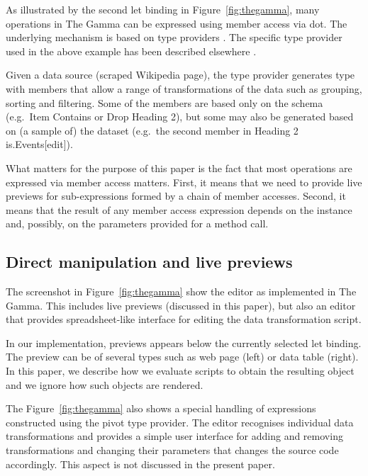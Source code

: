 \documentclass[sigplan,10pt]{acmart}\settopmatter{printfolios=true,printccs=false,printacmref=false}
\theoremstyle{plain}
\theoremstyle{definition}
\newcommand{\ident}[1]{\textnormal{\sffamily #1}}
\begin{document}
As illustrated by the second let binding in Figure~\ref{fig:thegamma}, many operations
in The Gamma can be expressed using member access via dot. The underlying mechanism is based
on type providers \cite{providers-fsharp,providers-idris}. The specific type provider used in 
the above example has been described elsewhere \cite{gamma}.

Given a data source (scraped Wikipedia page), the type provider generates type with members that allow
a range of transformations of the data such as grouping, sorting and filtering. Some of the members
are based only on the schema (e.g.~\ident{\textquotesingle Item Contains\textquotesingle} or 
\ident{\textquotesingle Drop Heading 2\textquotesingle}), but some may also be generated based
on (a sample of) the dataset (e.g.~the second member in \ident{\textquotesingle Heading 2 
is\textquotesingle.\textquotesingle Events[edit]\textquotesingle}). 

What matters for the purpose of this paper is 
the fact that most operations are expressed via member access matters. First, it means 
that we need to provide live previews for sub-expressions formed by a chain of member accesses.
Second, it means that the result of any member access expression depends on the instance and,
possibly, on the parameters provided for a method call.

\subsection{Direct manipulation and live previews}
The screenshot in Figure~\ref{fig:thegamma} show the editor as implemented in The Gamma. This
includes live previews (discussed in this paper), but also an editor that provides spreadsheet-like
interface for editing the data transformation script.

In our implementation, previews appears below the currently selected let binding.
The preview can be of several types such as web page (left) or data table (right). In this paper,
we describe how we evaluate scripts to obtain the resulting object and we ignore how such objects
are rendered.

The Figure~\ref{fig:thegamma} also shows a special handling of expressions constructed using the
pivot type provider. The editor recognises individual data transformations and provides a simple
user interface for adding and removing transformations and changing their parameters that changes
the source code accordingly. This aspect is not discussed in the present paper. 
\end{document}
